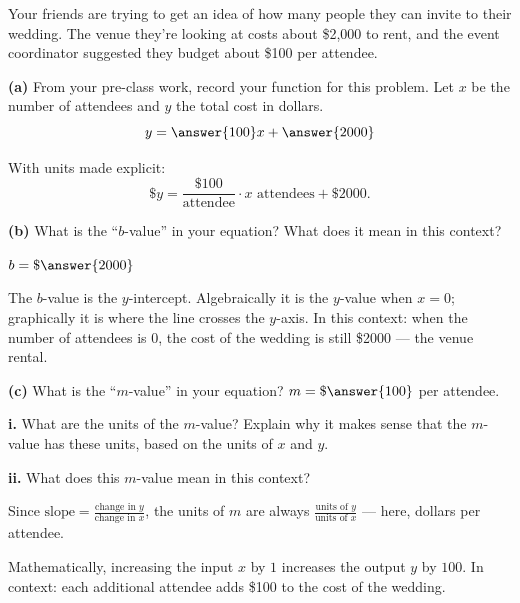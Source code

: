 \documentclass[12pt]{ximera}
\begin{document}
\begin{problem}
Your friends are trying to get an idea of how many people they can invite to their
wedding. The venue they're looking at costs about \$2,000 to rent, and the event
coordinator suggested they budget about \$100 per attendee.

\begin{prompt}
\textbf{(a)} From your pre-class work, record your function for this problem. Let $x$
be the number of attendees and $y$ the total cost in dollars.
\[
y = \answer{100} x + \answer{2000}
\]

\begin{solution}
With units made explicit:
\[
\$y = \frac{\$100}{\text{attendee}} \cdot x \text{ attendees} + \$2000.
\]
\end{solution}
\end{prompt}

\begin{prompt}
\textbf{(b)} What is the ``$b$-value'' in your equation? What does it mean in this
context?

$b = \$\answer{2000}$

\begin{freeResponse}
\end{freeResponse}

\begin{solution}
The $b$-value is the $y$-intercept. Algebraically it is the $y$-value when $x = 0$;
graphically it is where the line crosses the $y$-axis. In this context: when the
number of attendees is $0$, the cost of the wedding is still \$2000 --- the venue
rental.
\end{solution}
\end{prompt}

\begin{prompt}
\textbf{(c)} What is the ``$m$-value'' in your equation?
$m = \$\answer{100}$ per attendee.

\textbf{i.} What are the units of the $m$-value? Explain why it makes sense that the
$m$-value has these units, based on the units of $x$ and $y$.
\begin{freeResponse}
\end{freeResponse}

\textbf{ii.} What does this $m$-value mean in this context?
\begin{freeResponse}
\end{freeResponse}

\begin{solution}
Since $\text{slope} = \frac{\text{change in } y}{\text{change in } x}$, the units of
$m$ are always $\frac{\text{units of } y}{\text{units of } x}$ --- here, dollars per
attendee.

Mathematically, increasing the input $x$ by $1$ increases the output $y$ by $100$. In
context: each additional attendee adds \$100 to the cost of the wedding.
\end{solution}
\end{prompt}
\end{problem}
\end{document}
